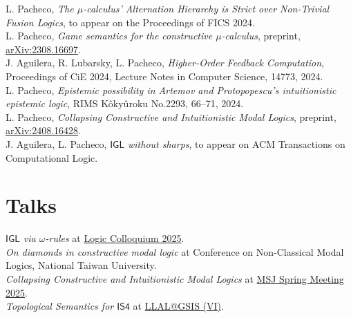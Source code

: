 \documentclass[11pt, a4paper]{article}
\newcommand{\years}[1]{\marginnote{\scriptsize #1}}
\begin{document}
L. Pacheco, \emph{The $\mu$-calculus' Alternation Hierarchy is Strict over Non-Trivial Fusion Logics}, to appear on the Proceedings of FICS 2024. \\

L. Pacheco, \emph{Game semantics for the constructive $\mu$-calculus}, preprint, \href{https://arxiv.org/abs/2308.16697}{arXiv:2308.16697}. \\

J. Aguilera, R. Lubarsky, L. Pacheco, \emph{Higher-Order Feedback Computation}, Proceedings of CiE 2024, Lecture Notes in Computer Science, 14773, 2024. \\

L. Pacheco, \emph{Epistemic possibility in Artemov and Protopopescu's intuitionistic epistemic logic}, RIMS Kôkyûroku No.2293, 66--71, 2024. \\

L. Pacheco, \emph{Collapsing Constructive and Intuitionistic Modal Logics}, preprint, \href{https://arxiv.org/abs/2408.16428}{arXiv:2408.16428}. \\

J. Aguilera, L. Pacheco, \emph{$\mathsf{IGL}$ without sharps}, to appear on ACM Transactions on Computational Logic. \\

\newpage
\section*{Talks}


\years{2025} \emph{\(\mathsf{IGL}\) via \(\omega\)-rules} at \href{https://www.colloquium.co/lc2025}{Logic Colloquium 2025}.\\

\years{2025} \emph{On diamonds in constructive modal logic} at Conference on Non-Classical Modal Logics, National Taiwan University.\\

\years{2025} \emph{Collapsing Constructive and Intuitionistic Modal Logics} at \href{https://www.mathsoc.jp/en/meeting/waseda25mar/}{MSJ Spring Meeting 2025}.\\

\years{2025} \emph{Topological Semantics for \(\mathsf{IS4}\)} at \href{https://sites.google.com/view/llal-at-gsis/meetings/llalgsis-6}{LLAL@GSIS (VI)}.\\
\end{document}
